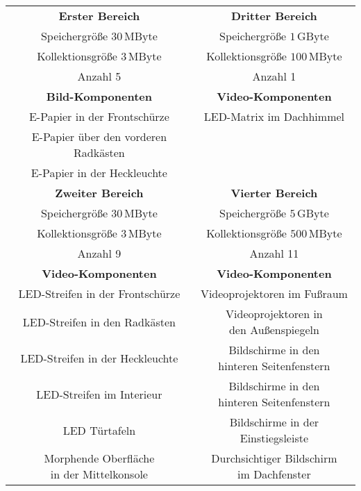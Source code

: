 \begin{table}[]	
	\centering
	\renewcommand{\arraystretch}{1.5}	%
	\label{tab:Einteilung2}
	\begin{tabular}{|c|c|}
		\hline
		\textbf{Erster Bereich} & \textbf{Dritter Bereich} \\
		Speichergröße $ 30\,\mathrm{MByte} $ &  Speichergröße $ 1\,\mathrm{GByte} $ \\
		Kollektionsgröße $ 3\,\mathrm{MByte} $ & Kollektionsgröße $ 100\,\mathrm{MByte} $ \\
		Anzahl 5 & Anzahl 1 \\
		\textbf{Bild-Komponenten} & \textbf{Video-Komponenten} \\
		\parbox[t]{0.3\linewidth}{\centering E-Papier in der Frontschürze} & \parbox[t]{0.3\linewidth}{\centering LED-Matrix im Dachhimmel}  \\
		\parbox[t]{0.3\linewidth}{\centering E-Papier über den vorderen Radkästen} &  \\
		\parbox[t]{0.3\linewidth}{\centering E-Papier in der Heckleuchte} &  \\
		\hline
		\textbf{Zweiter Bereich} & \textbf{Vierter Bereich} \\
		Speichergröße $ 30\,\mathrm{MByte} $ & Speichergröße $ 5\,\mathrm{GByte} $ \\
		Kollektionsgröße $ 3\,\mathrm{MByte} $ & Kollektionsgröße $ 500\,\mathrm{MByte} $ \\
		Anzahl 9 & Anzahl 11 \\
		\textbf{Video-Komponenten} & \textbf{Video-Komponenten} \\
		\parbox[t]{0.3\linewidth}{\centering LED-Streifen in der Frontschürze} & \parbox[t]{0.3\linewidth}{\centering Videoprojektoren im Fußraum} \\
		\parbox[t]{0.3\linewidth}{\centering LED-Streifen in den Radkästen} & \parbox[t]{0.3\linewidth}{\centering Videoprojektoren in\\den Außenspiegeln} \\ 
		\parbox[t]{0.3\linewidth}{\centering LED-Streifen in der Heckleuchte} & \parbox[t]{0.3\linewidth}{\centering Bildschirme in den\\hinteren Seitenfenstern} \\ 
		\parbox[t]{0.3\linewidth}{\centering LED-Streifen im Interieur} & \parbox[t]{0.3\linewidth}{\centering Bildschirme in den\\hinteren Seitenfenstern} \\
		\parbox[t]{0.3\linewidth}{\centering LED Türtafeln} & \parbox[t]{0.3\linewidth}{\centering  Bildschirme in der Einstiegsleiste} \\
		\parbox[t]{0.3\linewidth}{\centering Morphende Oberfläche\\in der Mittelkonsole}& \parbox[t]{0.3\linewidth}{\centering Durchsichtiger Bildschirm\\im Dachfenster} \\
		\hline
	\end{tabular} 
\end{table}

